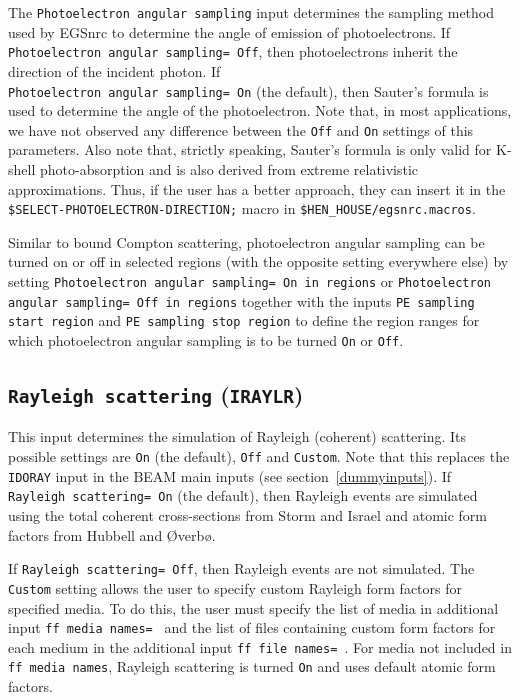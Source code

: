 \documentclass[12pt,twoside]{article}
\begin{document}
The {\tt Photoelectron angular sampling} input determines the sampling method
used by EGSnrc to determine the angle of emission of photoelectrons.
If {\tt Photoelectron angular sampling= Off}, then
photoelectrons inherit the direction of the incident photon.  If\\
{\tt Photoelectron angular sampling= On} (the default), then Sauter's formula
\cite{Sa31} is used to determine the angle of the photoelectron.  Note
that, in most applications, we have not observed any difference between
the {\tt Off} and {\tt On} settings of this parameters.  Also note that,
strictly speaking, Sauter's formula is only valid for K-shell photo-absorption
and is also derived from extreme relativistic approximations.  Thus, if
the user has a better approach, they can insert it in the
{\tt \$SELECT-PHOTOELECTRON-DIRECTION;} macro in
{\tt \$HEN\_HOUSE/egsnrc.macros}.

Similar to bound Compton scattering, photoelectron angular sampling
can be turned on or off in selected regions (with the opposite setting
everywhere else) by setting
{\tt Photoelectron angular sampling= On in regions} or
{\tt Photoelectron angular sampling= Off in regions} together with
the inputs {\tt PE sampling start region} and
{\tt PE sampling stop region} to define the region ranges for which
photoelectron angular sampling is to be turned {\tt On} or {\tt Off}.

\subsection{ {\tt Rayleigh scattering} ({\tt IRAYLR})}
\label{rayleighsect}

This input determines the simulation of Rayleigh (coherent) scattering.
Its possible settings are {\tt On} (the default), {\tt Off} and {\tt Custom}.
Note that this replaces the {\tt IDORAY} input
in the BEAM main inputs (see section~\ref{dummyinputs}).
If {\tt Rayleigh scattering= On} (the default), then Rayleigh events are simulated
using the total coherent cross-sections from Storm and
Israel\cite{SI70} and atomic form factors from Hubbell and {\O}verb{\o}\cite{HO79}.

If {\tt Rayleigh scattering= Off}, then Rayleigh events are not simulated.  The
{\tt Custom} setting  allows the user to
specify custom Rayleigh form factors for specified media.  To do this, the user
must specify the list of media in additional input {\tt ff media names= } and
the list of files containing custom form factors for each medium in the
additional input {\tt ff file names= }.  For media not included in {\tt ff media
names}, Rayleigh scattering is turned {\tt On} and uses default atomic form
factors.
\end{document}
